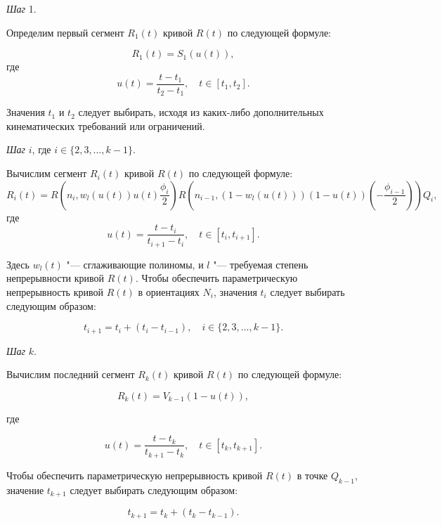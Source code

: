 \bigskip
\textit{Шаг} 1.

Определим первый сегмент $R_1(t)$ кривой $R(t)$ по следующей формуле:

$$
R_1(t)=S_1(u(t)),
$$
\noindent где
$$
u(t)=\frac{t-t_1}{t_2-t_1}, \quad t \in [t_1,t_2].
$$

Значения $t_1$ и $t_2$ следует выбирать, исходя из каких-либо дополнительных кинематических требований или ограничений.

\bigskip
\textit{Шаг} $i$, где $i \in \{2,3,\dots,k-1\}$.

Вычислим сегмент $R_i(t)$ кривой $R(t)$ по следующей формуле:
$$
R_i(t)=R(n_i,w_l(u(t))u(t)\frac{\phi_i}{2})R(n_{i-1},(1-w_l(u(t)))(1-u(t))(-\frac{\phi_{i-1}}{2}))Q_i,
$$
\noindent где
$$
u(t)=\frac{t-t_i}{t_{i+1}-t_i}, \quad t \in [t_i,t_{i+1}].
$$

Здесь $w_l(t)$ "--- сглаживающие полиномы, и $l$ "--- требуемая степень непрерывности кривой $R(t)$. Чтобы обеспечить
параметрическую непрерывность кривой $R(t)$ в ориентациях $N_i$, значения $t_i$ следует выбирать следующим образом:

$$
t_{i+1}=t_i+(t_i-t_{i-1}), \quad i \in \{2,3,\dots,k-1\}.
$$

\bigskip
\textit{Шаг} $k$.

Вычислим последний сегмент $R_k(t)$ кривой $R(t)$ по следующей формуле:

$$
R_k(t)=V_{k-1}(1-u(t)),
$$

\noindent где

$$
u(t)=\frac{t-t_k}{t_{k+1}-t_k}, \quad t \in [t_k,t_{k+1}].
$$

Чтобы обеспечить параметрическую непрерывность кривой $R(t)$ в точке $Q_{k-1}$, значение $t_{k+1}$ следует выбирать
следующим образом:

$$
t_{k+1}=t_k+(t_k-t_{k-1}).
$$
